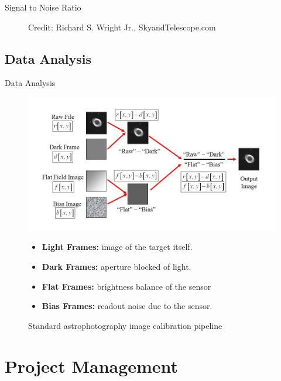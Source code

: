 \documentclass[11pt, aspectratio=169]{beamer}
\begin{document}
\begin{frame}{Signal to Noise Ratio}
\begin{figure}[!htb]
\begin{minipage}{0.3\textwidth}
	 	\caption{Credit: Richard S. Wright Jr., SkyandTelescope.com}
    \end{minipage}
\end{figure}
\end{frame}

\subsection{Data Analysis}
\begin{frame}{Data Analysis}
\begin{figure}[!htb]
    \centering
    \begin{minipage}{0.7\textwidth}
        \centering
        \includegraphics[width=0.9\linewidth]{figures/images/correctionpipeline.jpg}
        \caption{Standard astrophotography image calibration pipeline}
    \end{minipage}%
    \begin{minipage}{0.3\textwidth}
    \begin{itemize}%
        \item \textbf{Light Frames:} image of the target itself.
        \item \textbf{Dark Frames:} aperture blocked of light.
        \item \textbf{Flat Frames:} brightness balance of the sensor
        \item \textbf{Bias Frames:} readout noise due to the sensor. 
    \end{itemize}
    \end{minipage}
\end{figure}
\end{frame}


\section{Project Management}
\end{document}
